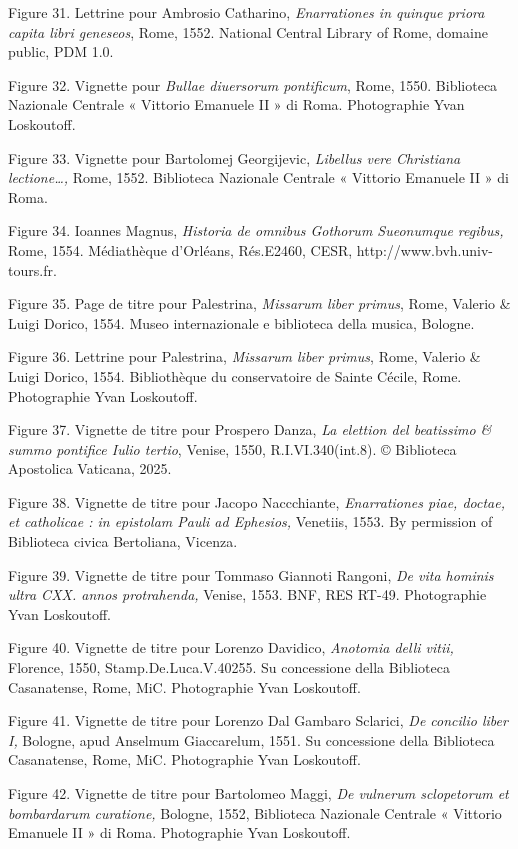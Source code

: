 \documentclass[12pt,twoside,openany]{book}
\begin{document}
Figure 31. Lettrine pour Ambrosio Catharino, \textit{Enarrationes in quinque priora capita libri geneseos}, Rome, 1552. National Central Library of Rome, domaine public, PDM 1.0.

Figure 32. Vignette pour \textit{Bullae diuersorum pontificum}, Rome, 1550. Biblioteca Nazionale Centrale « Vittorio Emanuele II » di Roma. Photographie Yvan Loskoutoff.

Figure 33. Vignette pour Bartolomej Georgijevic, \textit{Libellus vere Christiana lectione…, }Rome, 1552. Biblioteca Nazionale Centrale « Vittorio Emanuele II » di Roma.

Figure 34. Ioannes Magnus, \textit{Historia de omnibus Gothorum Sueonumque regibus,} Rome, 1554. Médiathèque d’Orléans, Rés.E2460, CESR, http://www.bvh.univ-tours.fr.

Figure 35. Page de titre pour Palestrina, \textit{Missarum liber primus}, Rome, Valerio \& Luigi Dorico, 1554. Museo internazionale e biblioteca della musica, Bologne.

Figure 36. Lettrine pour Palestrina, \textit{Missarum liber primus}, Rome, Valerio \& Luigi Dorico, 1554. Bibliothèque du conservatoire de Sainte Cécile, Rome. Photographie Yvan Loskoutoff.

Figure 37. Vignette de titre pour Prospero Danza, \textit{La elettion del beatissimo \& summo pontifice Iulio tertio}, Venise, 1550, R.I.VI.340(int.8). © Biblioteca Apostolica Vaticana, 2025.

Figure 38. Vignette de titre pour Jacopo Naccchiante, \textit{Enarrationes piae, doctae, et catholicae : in epistolam Pauli ad Ephesios, }Venetiis, 1553. By permission of Biblioteca civica Bertoliana, Vicenza.

Figure 39. Vignette de titre pour Tommaso Giannoti Rangoni, \textit{De vita hominis ultra CXX. annos protrahenda, }Venise, 1553. BNF, RES RT-49. Photographie Yvan Loskoutoff.

Figure 40. Vignette de titre pour Lorenzo Davidico, \textit{Anotomia delli vitii, }Florence, 1550, Stamp.De.Luca.V.40255. Su concessione della Biblioteca Casanatense, Rome, MiC. Photographie Yvan Loskoutoff.

Figure 41. Vignette de titre pour Lorenzo Dal Gambaro Sclarici, \textit{De concilio liber I, }Bologne, apud Anselmum Giaccarelum, 1551. Su concessione della Biblioteca Casanatense, Rome, MiC. Photographie Yvan Loskoutoff.

Figure 42. Vignette de titre pour Bartolomeo Maggi, \textit{De vulnerum sclopetorum et bombardarum curatione, }Bologne, 1552, Biblioteca Nazionale Centrale « Vittorio Emanuele II » di Roma. Photographie Yvan Loskoutoff.
\end{document}
